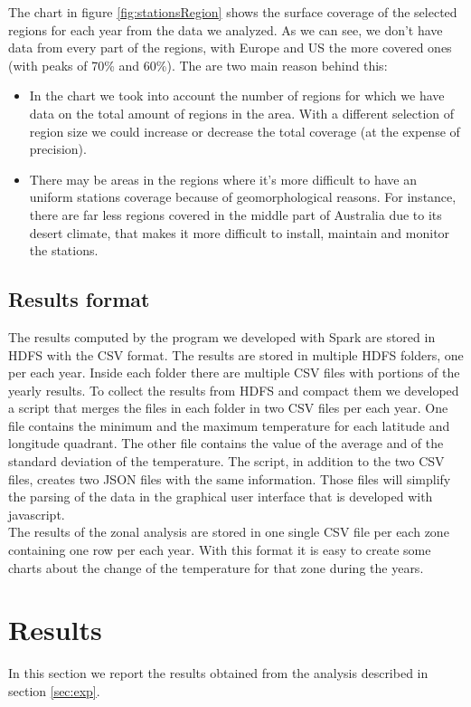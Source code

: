 \documentclass{vldb}
\begin{document}
The chart in figure \ref{fig:stationsRegion} shows the surface coverage of the selected regions for each year from the data we analyzed. As we can see, we don't have data from every part of the regions, with Europe and US the more covered ones (with peaks of 70\% and 60\%). The are two main reason behind this:
\begin{itemize}
    \item In the chart we took into account the number of regions for which we have data on the total amount of regions in the area. With a different selection of region size we could increase or decrease the total coverage (at the expense of precision).
    \item There may be areas in the regions where it's more difficult to have an uniform stations coverage because of geomorphological reasons. For instance, there are far less regions covered in the middle part of Australia due to its desert climate, that makes it more difficult to install, maintain and monitor the stations.
\end{itemize}


\subsection{Results format}
The results computed by the program we developed with Spark are stored in HDFS with the CSV format. The results are stored in multiple HDFS folders, one per each year. Inside each folder there are multiple CSV files with portions of the yearly results. To collect the results from HDFS and compact them we developed a script that merges the files in each folder in two CSV files per each year. One file contains the minimum and the maximum temperature for each latitude and longitude quadrant. The other file contains the value of the average and of the standard deviation of the temperature.
The script, in addition to the two CSV files, creates two JSON files with the same information. Those files will simplify the parsing of the data in the graphical user interface that is developed with javascript. 
\\ The results of the zonal analysis are stored in one single CSV file per each zone containing one row per each year. With this format it is easy to create some charts about the change of the temperature for that zone during the years.



\FloatBarrier

\section{Results}
\label{sec:res}
In this section we report the results obtained from the analysis described in section \ref{sec:exp}. 
\end{document}
